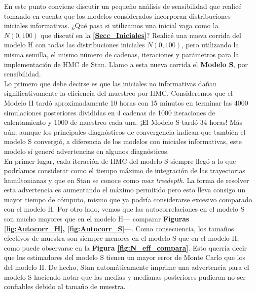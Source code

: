  En este punto conviene discutir un pequeño análisis de sensibilidad que realicé tomando en cuenta que los modelos considerados incorporan distribuciones iniciales informativas. ¿Qué pasa si utilizamos una inicial vaga como la $N(0,100)$ que discutí en la \textbf{\autoref{Secc_Iniciales}}? Realicé una nueva corrida del modelo H con todas las distribuciones iniciales $N(0,100)$, pero utilizando la misma semilla, el mismo número de cadenas, iteraciones y parámetros para la implementación de HMC de Stan. Llamo a esta nueva corrida el \textbf{Modelo S}, por sensibilidad.\\
  
 Lo primero que debe decirse es que las iniciales no informativas dañan significativamente la eficiencia del muestreo por HMC. Consideremos que el Modelo H tardó aproximadamente 10 horas con 15 minutos en terminar las 4000 simulaciones posteriores divididas en 4 cadenas de 1000 iteraciones de calentamiento y 1000 de muestreo cada una. ¡El Modelo S tardó 34 horas! Más aún, aunque los principales diagnósticos de convergencia indican que también el modelo S convergió, a diferencia de los modelos con iniciales informativas, este modelo sí generó advertencias en algunos diagnósticos.\\
 
 En primer lugar, cada iteración de HMC del modelo S siempre llegó a lo que podríamos considerar como el tiempo máximo de integración de las trayectorias hamiltonianas y que en Stan se conoce como \textit{max treedepth}. La forma de resolver esta advertencia es aumentando el máximo permitido pero esto lleva consigo un mayor tiempo de cómputo, mismo que ya podría considerarse excesivo comparado con el modelo H. Por otro lado, vemos que las autocorrelaciones en el modelo S son mucho mayores que en el modelo H--- comparar \textbf{Figuras  \ref{fig:Autocorr_H}, \ref{fig:Autocorr_S}}---. Como consecuencia, los tamaños efectivos de muestra son siempre menores en el modelo S que en el modelo H, como puede observarse en la \textbf{Figura \ref{fig:N_eff_compara}}. Esto querría decir que los estimadores del modelo S tienen un mayor error de Monte Carlo que los del modelo H. De hecho, Stan automáticamente imprime una advertencia para el modelo S haciendo notar que las medias y medianas posteriores pudieran no ser confiables debido al tamaño de muestra.\\
 
